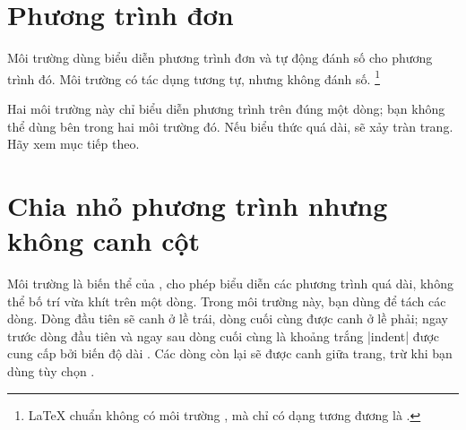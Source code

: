 \section{Phương trình đơn}

Môi trường  dùng biểu diễn phương trình đơn
và tự động đánh số cho phương trình đó. Môi trường 
có tác dụng tương tự, nhưng không đánh số.%
\footnote{\LaTeX{} chuẩn không có môi trường , mà
chỉ có dạng tương đương là .}

\medskip

Hai môi trường này chỉ biểu diễn phương trình trên đúng một dòng;
bạn không thể dùng \cn{\\} bên trong hai môi trường đó.
Nếu biểu thức quá dài, sẽ xảy tràn trang. Hãy xem mục tiếp theo.

\section{Chia nhỏ phương trình nhưng không canh cột}

Môi trường  là biến thể của , cho phép
biểu diễn các phương trình quá dài, không thể bố trí vừa khít trên một dòng.
Trong môi trường này, bạn dùng \cn{\\} để tách các dòng.
Dòng đầu tiên sẽ canh ở lề trái, dòng cuối cùng được canh ở lề phải;
ngay trước dòng đầu tiên và ngay sau dòng cuối cùng là khoảng trắng |indent|
được cung cấp bởi biến độ dài .
Các dòng còn lại sẽ được canh giữa trang, trừ khi bạn dùng tùy chọn .

